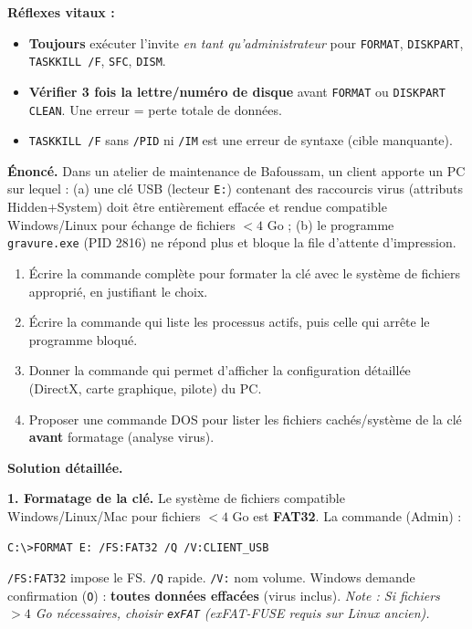 \documentclass[11pt]{article}
\begin{document}
\begin{methode}
\textbf{Réflexes vitaux :}
\begin{itemize}
  \item \textbf{Toujours} exécuter l'invite \emph{en tant qu'administrateur} pour \texttt{FORMAT}, \texttt{DISKPART}, \texttt{TASKKILL /F}, \texttt{SFC}, \texttt{DISM}.
  \item \textbf{Vérifier 3 fois la lettre/numéro de disque} avant \texttt{FORMAT} ou \texttt{DISKPART CLEAN}. Une erreur = perte totale de données.
  \item \texttt{TASKKILL /F} sans \texttt{/PID} ni \texttt{/IM} est une erreur de syntaxe (cible manquante).
\end{itemize}
\end{methode}

\begin{exoresolu}
\textbf{Énoncé.} Dans un atelier de maintenance de Bafoussam, un client apporte un PC sur lequel : (a) une clé USB (lecteur \texttt{E:}) contenant des raccourcis virus (attributs Hidden+System) doit être entièrement effacée et rendue compatible Windows/Linux pour échange de fichiers $< 4$ Go ; (b) le programme \texttt{gravure.exe} (PID 2816) ne répond plus et bloque la file d'attente d'impression.
\begin{enumerate}
  \item Écrire la commande complète pour formater la clé avec le système de fichiers approprié, en justifiant le choix.
  \item Écrire la commande qui liste les processus actifs, puis celle qui arrête le programme bloqué.
  \item Donner la commande qui permet d'afficher la configuration détaillée (DirectX, carte graphique, pilote) du PC.
  \item Proposer une commande DOS pour lister les fichiers cachés/système de la clé \textbf{avant} formatage (analyse virus).
\end{enumerate}
\tcblower
\textbf{Solution détaillée.}

\textbf{1. Formatage de la clé.} Le système de fichiers compatible Windows/Linux/Mac pour fichiers $< 4$ Go est \textbf{FAT32}. La commande (Admin) :
\begin{lstlisting}
C:\>FORMAT E: /FS:FAT32 /Q /V:CLIENT_USB
\end{lstlisting}
\texttt{/FS:FAT32} impose le FS. \texttt{/Q} rapide. \texttt{/V:} nom volume. Windows demande confirmation (\texttt{O}) : \textbf{toutes données effacées} (virus inclus). \textit{Note : Si fichiers $> 4$ Go nécessaires, choisir \texttt{exFAT} (exFAT-FUSE requis sur Linux ancien).}


\end{exoresolu}
\end{document}
